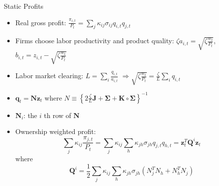 \documentclass[english,aspectratio=169,handout]{beamer}
\theoremstyle{plain}
\newcommand{\mat}[1]{\bm{#1}}
\begin{document}
%
\begin{frame}{Static Profits}
  \begin{itemize}
    \item \label{Q}Real gross profit: $\frac{\pi_{i,t}}{P_{t}}=\sum_{j}\kappa_{ij}\sigma_{ij}q_{i,t}q_{j,t}$
    \item Firms choose labor productivity and product quality: $\zeta a_{i,t}=\sqrt{\zeta\frac{w_{t}}{P_{t}}}$,
          $b_{i,t}=z_{i,t}-\sqrt{\zeta\frac{w_{t}}{P_{t}}}$
    \item Labor market clearing: $L=\sum_{i}\frac{q_{i,t}}{a_{i,t}}$ $\Longrightarrow$$\sqrt{\zeta\frac{w_{t}}{P_{t}}}=\frac{\zeta}{L}\sum_{i}q_{i,t}$
    \item $\mathbf{q}_{t}=\mat{N}\mathbf{z}_{t}$ where $N\equiv\left\{ 2\frac{\zeta}{L}\mat{J}+\mat{\Sigma}+\mat{K}\circ\mat{\Sigma}\right\} ^{-1}$
    \item $\mat{N}_{i}$: the $i$ th row of $\mat{N}$
    \item Ownership weighted profit:
          \[
            \sum_{j}\kappa_{ij}\frac{\pi_{j,t}}{P_{t}}=\sum_{j}\kappa_{ij}\sum_{h}\kappa_{jh}\sigma_{jh}q_{j,t}q_{h,t}=\mathbf{z}_{t}^{T}\mat{Q}^{i}\mathbf{z}_{t}
          \]
          where
          \[
            \mat{Q}^{i}=\frac{1}{2}\sum_{j}\kappa_{ij}\sum_{h}\kappa_{jh}\sigma_{jh}\left(N_{j}^{T}N_{h}+N_{h}^{T}N_{j}\right)
          \]
          \hyperlink{cournot}{}
  \end{itemize}
\end{frame}
%
\end{document}
